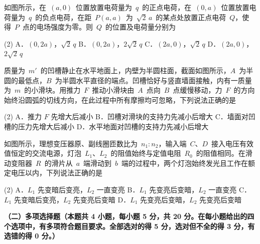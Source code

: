 \begin{question}
如图所示，在~$(a,0)$~位置放置电荷量为~$q$~的正点电荷，在~$(0,a)$~位置放置电荷量为~$q$~的负点电荷，在距~$P(a,a)$~为~$\sqrt{2}\,a$~的某点处放置正点电荷~$Q$，使得~$P$~点的电场强度为零。则~$Q$~的位置及电荷量分别为\gkblank


\begin{gkopts}(2)
  \task A．$(0,2a)$，$\sqrt{2}\,q$
  \task B．$(0,2a)$，$2\sqrt{2}\,q$
  \task C．$(2a,0)$，$\sqrt{2}\,q$
  \task D．$(2a,0)$，$2\sqrt{2}\,q$
\end{gkopts}
\end{question}

\begin{question}
质量为~$m'$~的凹槽静止在水平地面上，内壁为半圆柱面，截面如图所示，$A$~为半圆的最低点，$B$~为半圆水平直径的端点。凹槽恰好与竖直墙面接触，内有一质量为~$m$~的小滑块。用推力~$F$~推动小滑块由~$A$~点向~$B$~点缓慢移动，力~$F$~的方向始终沿圆弧的切线方向，在此过程中所有摩擦均可忽略，下列说法正确的是\gkblank


\begin{gkopts}(2)
  \task A．推力 $F$ 先增大后减小
  \task B．凹槽对滑块的支持力先减小后增大
  \task C．墙面对凹槽的压力先增大后减小
  \task D．水平地面对凹槽的支持力先减小后增大
\end{gkopts}
\end{question}

\begin{question}
如图所示，理想变压器原、副线圈匝数比为~$n_{1}:n_{2}$，输入端~$C$、$D$~接入电压有效值恒定的交流电源，灯泡~$L_{1}$、$L_{2}$~的阻值始终与定值电阻~$R_{0}$~的阻值相同。在滑动变阻器~$R$~的滑片从~$a$~端滑动到~$b$~端的过程中，两个灯泡始终发光且工作在额定电压以内，下列说法正确的是\gkblank


\begin{gkopts}(2)
  \task A．$L_{1}$ 先变暗后变亮，$L_{2}$ 一直变亮
  \task B．$L_{1}$ 先变亮后变暗，$L_{2}$ 一直变亮
  \task C．$L_{1}$ 先变暗后变亮，$L_{2}$ 先变亮后变暗
  \task D．$L_{1}$ 先变亮后变暗，$L_{2}$ 先变亮后变暗
\end{gkopts}
\end{question}

\textbf{（二）多项选择题（本题共 4 小题，每小题 5 分，共 20 分。在每小题给出的四个选项中，有多项符合题目要求。全部选对的得 5 分，选对但不全的得 3 分，有选错的得 0 分。）}

